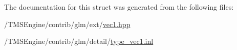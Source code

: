 The documentation for this struct was generated from the following files\+:\begin{DoxyCompactItemize}
\item 
/\+T\+M\+S\+Engine/contrib/glm/ext/\hyperlink{ext_2vec1_8hpp}{vec1.\+hpp}\item 
/\+T\+M\+S\+Engine/contrib/glm/detail/\hyperlink{type__vec1_8inl}{type\+\_\+vec1.\+inl}\end{DoxyCompactItemize}
